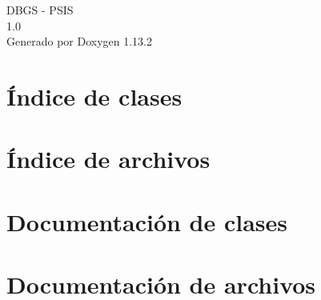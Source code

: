 \documentclass[twoside]{book}
\newcommand{\+}{\discretionary{\mbox{\scriptsize$\hookleftarrow$}}{}{}}
\newcommand{\clearemptydoublepage}{%
    \newpage{\pagestyle{empty}\cleardoublepage}%
  }
\begin{document}
  \raggedbottom
    \hypersetup{pageanchor=false,
                bookmarksnumbered=true,
                pdfencoding=unicode
               }
  \begin{titlepage}
  \vspace*{7cm}
  \begin{center}%
  {\Large DBGS -\/ PSIS}\\
  [1ex]\large 1.\+0 \\
  \vspace*{1cm}
  {\large Generado por Doxygen 1.13.2}\\
  \end{center}
  \end{titlepage}
  \clearemptydoublepage
  \tableofcontents
  \clearemptydoublepage
  \hypersetup{pageanchor=true}


\chapter{Índice de clases}

\chapter{Índice de archivos}

\chapter{Documentación de clases}








\chapter{Documentación de archivos}















  \backmatter
  \newpage
  \clearemptydoublepage
  \printindex
\end{document}
